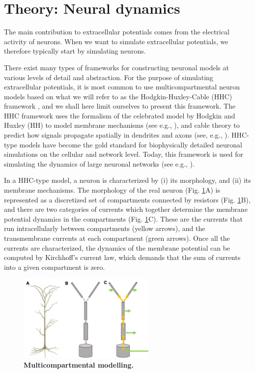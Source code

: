 \section{Theory: Neural dynamics}
\label{sec:Neuron}
The main contribution to extracellular potentials comes from the electrical activity of neurons. When we want to simulate extracellular potentials, we therefore typically start by simulating neurons. 

There exist many types of frameworks for constructing neuronal models at various levels of detail and abstraction. For the purpose of simulating extracellular potentials, it is most common to use multicompartmental neuron models based on what we will refer to as the Hodgkin-Huxley-Cable (HHC) framework , and we shall here limit ourselves to present this framework. The HHC framework uses the formalism of the celebrated model by Hodgkin and Huxley (HH) to model membrane mechanisms (see e.g., \citep{Hodgkin1952, KockSegev1998, Pospischil2008}), and cable theory to predict how signals propagate spatially in dendrites and axons (see, e.g., \citep{Koch1999, rall2011}). HHC-type models have become the gold standard for biophysically detailed neuronal simulations on the cellular and network level. Today, this framework is used for simulating the dynamics of large neuronal networks (see e.g., \citep{traub2005, markram2015, arkhipov2018}).

In a HHC-type model, a neuron is characterized by (i) its morphology, and (ii) its membrane mechanisms. The morphology of the real neuron (Fig. \ref{Neuron:fig:multicomp}A) is represented as a discretized set of compartments connected by resistors (Fig. \ref{Neuron:fig:multicomp}B), and there are two categories of currents which together determine the membrane potential dynamics in the compartments (Fig. \ref{Neuron:fig:multicomp}C). These are the currents that run intracellularly between compartments (yellow arrows), and the transmembrane currents at each compartment (green arrows). Once all the currents are characterized, the dynamics of the membrane potential can be computed by Kirchhoff's current law, which demands that the sum of currents into a given compartment is zero.

\begin{figure}[!ht]
\begin{center}
\includegraphics[width=0.6\textwidth]{Figures/Neuron/Multicomp.png}
\end{center}
\caption{\textbf{Multicompartmental modelling.} 
}
\label{Neuron:fig:multicomp}
\end{figure}

